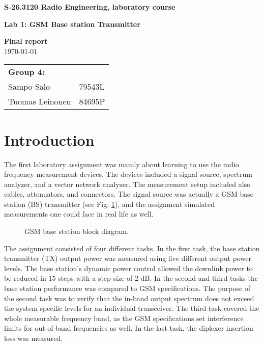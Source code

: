 \documentclass[a4paper, 12pt]{article}
\begin{document}
\begin{titlepage}
\pagestyle{empty}
\begin{center}

\vspace*{3cm}
\noindent\LARGE{\textbf{S-26.3120 Radio Engineering, laboratory course}}

\vspace*{2cm}

\Large{\textbf{Lab 1: GSM Base station Transmitter}}\\

\vspace*{1.5cm}

\large{\textbf{Final report}}\\
\vspace{1.5cm}
\large{\today}
	
\vspace*{3cm}
\large{
	\begin{tabular}{l l}
		\textbf{Group 4:} 	& \\
		Sampo Salo			& 79543L	\\
		Tuomas Leinonen 	& 84695P		
	\end{tabular}
}

\end{center}

\end{titlepage}


\section{Introduction}

The first laboratory assignment was mainly about learning to use the radio
frequency measurement devices. The devices included a signal source, spectrum
analyzer, and a vector network analyzer. The measurement setup included also
cables, attenuators, and connectors. The signal source was actually a GSM
base station (BS) transmitter (see Fig. \ref{fig:bs}), and the assignment simulated 
measurements one could face in real life as well. 

\begin{figure}[h!]
	\begin{center}
	\caption{GSM base station block diagram.}
	\label{fig:bs}
	\end{center}
	\vspace*{-12pt}
\end{figure}

The assignment consisted of four different tasks. In the first task, the base station 
transmitter (TX) output power was measured using five different output power levels. 
The base station's dynamic power control allowed the downlink power to be reduced in 
15 steps with a step size of 2 dB. In the second and third tasks the base station 
performance was compared to GSM specifications. The purpose of the second task 
was to verify that the in-band output spectrum does not exceed the system specific 
levels for an individual transceiver. The third task covered the whole measurable 
frequency band, as the GSM specifications set interference limits for out-of-band 
frequencies as well. In the last task, the diplexer insertion loss was measured.
\end{document}
